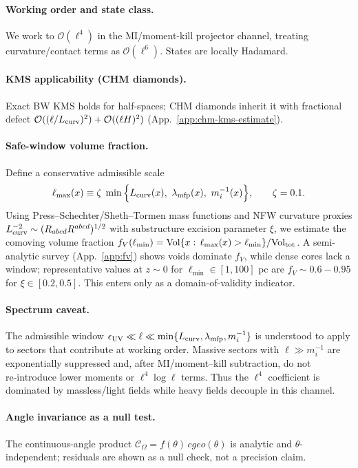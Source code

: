 \documentclass[aps,prd,onecolumn,superscriptaddress,nofootinbib]{revtex4-2}
\def\cgeo{cgeo}%
\def\Omega_\Lambda{OmegaLambda}%
\providecommand{\cgeo}{c_{\rm geo}}
\providecommand{\be}{\begin{equation}}
\providecommand{\ee}{\end{equation}}
\begin{document}
\paragraph{Working order and state class.} We work to \(\mathcal O(\ell^4)\) in the MI/moment-kill projector channel, treating curvature/contact terms as \(\mathcal O(\ell^6)\). States are locally Hadamard.

\paragraph{KMS applicability (CHM diamonds).} Exact BW KMS holds for half-spaces; CHM diamonds inherit it with fractional defect \(\mathcal O((\ell/L_{\rm curv})^2)+\mathcal O((\ell H)^2)\) (App.~\ref{app:chm-kms-estimate}).

\paragraph{Safe-window volume fraction.} Define a conservative admissible scale
\be
\label{eq:lmax}
\ell_{\max}(x)\equiv \zeta\;\min\Big\{L_{\rm curv}(x),\ \lambda_{\rm mfp}(x),\ m_i^{-1}(x)\Big\},\qquad \zeta=0.1.
\ee
Using Press--Schechter/Sheth--Tormen mass functions and NFW curvature proxies \(L_{\rm curv}^{-2}\sim (R_{abcd}R^{abcd})^{1/2}\) with substructure excision parameter \(\xi\), we estimate the comoving volume fraction \(f_V(\ell_{\min})=\mathrm{Vol}\{x:\,\ell_{\max}(x)>\ell_{\min}\}/\mathrm{Vol}_{\rm tot}\). A semi-analytic survey (App.~\ref{app:fv}) shows voids dominate \(f_V\), while dense cores lack a window; representative values at \(z\!\sim\!0\) for \(\ell_{\min}\in[1,100]\) pc are \(f_V\sim 0.6{-}0.95\) for \(\xi\in[0.2,0.5]\). This enters only as a domain-of-validity indicator.

\paragraph{Spectrum caveat.}
The admissible window \(\epsilon_{\rm UV}\ll \ell\ll\min\{L_{\rm curv},\lambda_{\rm mfp},m_i^{-1}\}\) is understood to apply to sectors that contribute at working order. Massive sectors with \(\ell\gg m_i^{-1}\) are exponentially suppressed and, after MI/moment–kill subtraction, do not re‑introduce lower moments or \(\ell^4\log\ell\) terms. Thus the \(\ell^4\) coefficient is dominated by massless/light fields while heavy fields decouple in this channel.

\paragraph{Angle invariance as a null test.} The continuous-angle product \(\mathcal C_\Omega=f(\theta)\,\cgeo(\theta)\) is analytic and \(\theta\)-independent; residuals are shown as a null check, not a precision claim.
\end{document}
